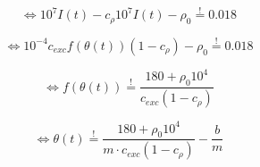 \documentclass[a4paper,10pt,hidelinks]{scrreprt}
\begin{document}
	\begin{equation}
	\Leftrightarrow 10^{7} I(t) - c_{\rho} 10^{7} I(t) - \rho_{0} 
	\overset{!}{=} 0.018
	\end{equation}
	
	\begin{equation}
	\Leftrightarrow 10^{-4} c_{exc} f(\theta(t)) (1 - c_{\rho}) - \rho_{0} 
	\overset{!}{=} 0.018
	\end{equation}
	
	\begin{equation}
	\Leftrightarrow f(\theta(t)) \overset{!}{=} \frac{180 + \rho_{0}10^{4}} 
	{c_{exc}(1 - c_{\rho})}
	\end{equation}
	
	\begin{equation}
	\Leftrightarrow \theta(t) \overset{!}{=} \frac{180 + \rho_{0}10^{4}} 
	{m \cdot c_{exc}(1 - c_{\rho})} - \frac{b}{m}
	\end{equation}
\end{document}
